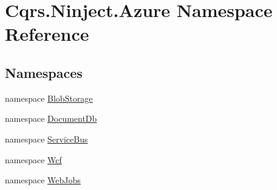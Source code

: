 \hypertarget{namespaceCqrs_1_1Ninject_1_1Azure}{}\section{Cqrs.\+Ninject.\+Azure Namespace Reference}
\label{namespaceCqrs_1_1Ninject_1_1Azure}
\subsection*{Namespaces}
\begin{DoxyCompactItemize}
\item 
namespace \hyperlink{namespaceCqrs_1_1Ninject_1_1Azure_1_1BlobStorage}{Blob\+Storage}
\item 
namespace \hyperlink{namespaceCqrs_1_1Ninject_1_1Azure_1_1DocumentDb}{Document\+Db}
\item 
namespace \hyperlink{namespaceCqrs_1_1Ninject_1_1Azure_1_1ServiceBus}{Service\+Bus}
\item 
namespace \hyperlink{namespaceCqrs_1_1Ninject_1_1Azure_1_1Wcf}{Wcf}
\item 
namespace \hyperlink{namespaceCqrs_1_1Ninject_1_1Azure_1_1WebJobs}{Web\+Jobs}
\end{DoxyCompactItemize}
